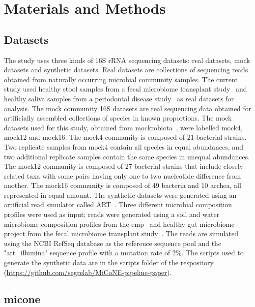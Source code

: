 
\section*{Materials and Methods}

  \subsection*{Datasets}

  \vspace{-5mm}
  The study uses three kinds of 16S rRNA sequencing datasets: real datasets, mock datasets and synthetic datasets.
  Real datasets are collections of sequencing reads obtained from naturally occurring microbial community samples.
  The current study used healthy stool samples from a fecal microbiome transplant study~\cite{Kang2017} and healthy saliva samples from a periodontal disease study~\cite{Chen2018} as real datasets for analysis.
  The mock community 16S datasets are real sequencing data obtained for artificially assembled collections of species in known proportions.
  The mock datasets used for this study, obtained from mockrobiota~\cite{Bokulich2016}, were labelled mock4, mock12 and mock16.
  The mock4 community is composed of 21 bacterial strains.
  Two replicate samples from mock4  contain all species in equal abundances, and two additional replicate samples contain the same species in unequal abundances.
  The mock12 community is composed of 27 bacterial strains that include closely related taxa with some pairs having only one to two nucleotide difference from another.
  The mock16 community is composed of 49 bacteria and 10 archea, all represented in equal amount.
  The synthetic datasets were generated using an artificial read simulator called ART~\cite{Huang2012}.
  Three different microbial composition profiles were used as input; reads were generated using a soil and water microbiome composition profiles from the \ac{emp}~\cite{Thompson2017} and healthy gut microbiome project from the fecal microbiome transplant study~\cite{Kang2017}.
  The reads are simulated using the NCBI RefSeq database as the reference sequence pool and the "art\_illumina" sequence profile with a mutation rate of 2\%.
  The scripts used to generate the synthetic data are in the scripts folder of the respository (\href{https://github.com/segrelab/MiCoNE-pipeline-paper}{https://github.com/segrelab/MiCoNE-pipeline-paper}).

  \subsection*{\ac{micone}}

